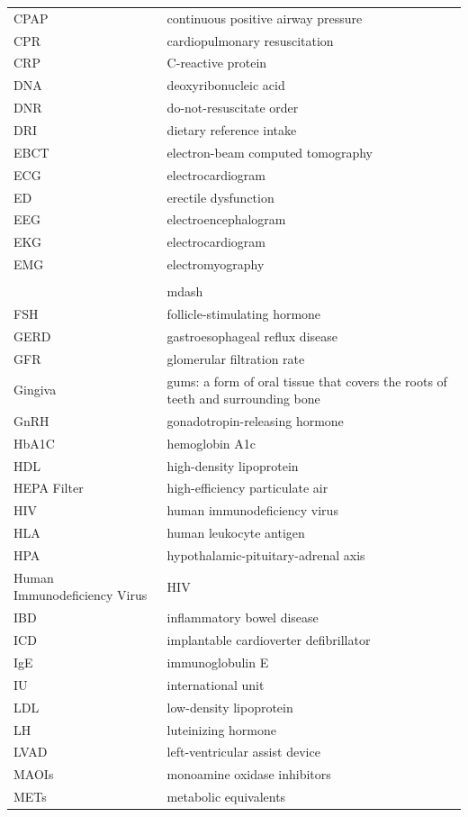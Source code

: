 \begin{longtable}{>{\raggedright\arraybackslash}p{} >{\raggedright\arraybackslash}p{}}
CPAP & continuous positive airway pressure \\
CPR & cardiopulmonary resuscitation \\
CRP & C-reactive protein \\
DNA & deoxyribonucleic acid \\
DNR & do-not-resuscitate order \\
DRI & dietary reference intake \\
EBCT & electron-beam computed tomography \\
ECG & electrocardiogram \\
ED & erectile dysfunction \\
EEG & electroencephalogram \\
EKG & electrocardiogram \\
EMG & electromyography\\\\&mdash \\
FSH & follicle-stimulating hormone \\
GERD & gastroesophageal reflux disease \\
GFR & glomerular filtration rate \\
Gingiva & gums: a form of oral tissue that covers the roots of teeth and surrounding bone \\
GnRH & gonadotropin-releasing hormone \\
HbA1C & hemoglobin A1c \\
HDL & high-density lipoprotein \\
HEPA Filter & high-efficiency particulate air \\
HIV & human immunodeficiency virus \\
HLA & human leukocyte antigen \\
HPA & hypothalamic-pituitary-adrenal axis \\
Human Immunodeficiency Virus & HIV \\
IBD & inflammatory bowel disease \\
ICD & implantable cardioverter defibrillator \\
IgE & immunoglobulin E \\
IU & international unit \\
LDL & low-density lipoprotein \\
LH & luteinizing hormone \\
LVAD & left-ventricular assist device \\
MAOIs & monoamine oxidase inhibitors \\
METs & metabolic equivalents \\

\end{longtable}
